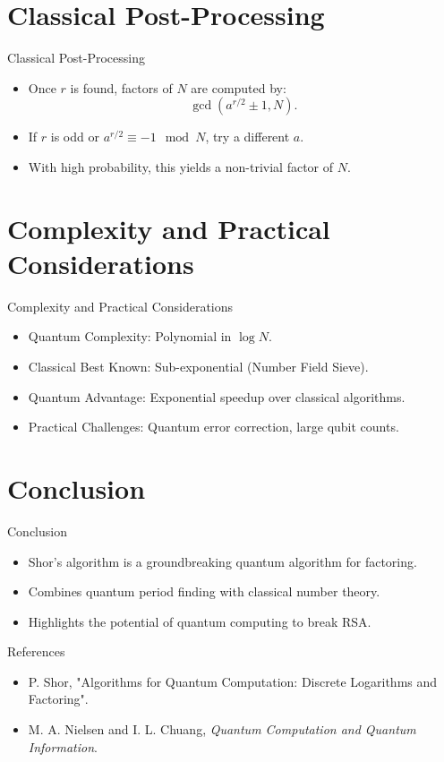 \documentclass{beamer}
\begin{document}
\section{Classical Post-Processing}
\begin{frame}{Classical Post-Processing}
    \begin{itemize}
        \item Once $r$ is found, factors of $N$ are computed by:
        \[ \gcd(a^{r/2} \pm 1, N). \]
        \item If $r$ is odd or $a^{r/2} \equiv -1 \mod N$, try a different $a$.
        \item With high probability, this yields a non-trivial factor of $N$.
    \end{itemize}
\end{frame}

\section{Complexity and Practical Considerations}
\begin{frame}{Complexity and Practical Considerations}
    \begin{itemize}
        \item Quantum Complexity: Polynomial in $\log N$.
        \item Classical Best Known: Sub-exponential (Number Field Sieve).
        \item Quantum Advantage: Exponential speedup over classical algorithms.
        \item Practical Challenges: Quantum error correction, large qubit counts.
    \end{itemize}
\end{frame}

\section{Conclusion}
\begin{frame}{Conclusion}
    \begin{itemize}
        \item Shor's algorithm is a groundbreaking quantum algorithm for factoring.
        \item Combines quantum period finding with classical number theory.
        \item Highlights the potential of quantum computing to break RSA.
    \end{itemize}
\end{frame}

\begin{frame}{References}
    \begin{itemize}
        \item P. Shor, "Algorithms for Quantum Computation: Discrete Logarithms and Factoring".
        \item M. A. Nielsen and I. L. Chuang, \textit{Quantum Computation and Quantum Information}.
    \end{itemize}
\end{frame}
\end{document}
